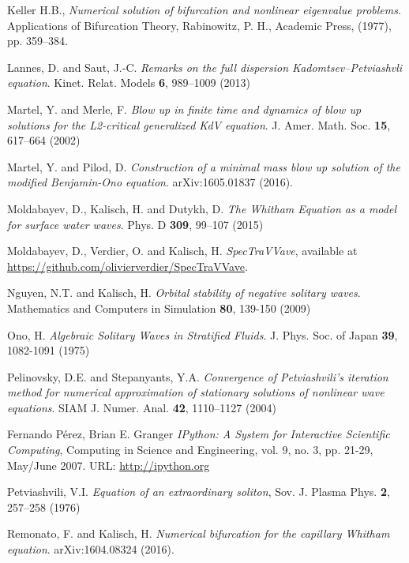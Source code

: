 \begin{thebibliography}{}
 
Keller H.B., 
{\em Numerical solution of bifurcation and nonlinear eigenvalue problems}. 
Applications of Bifurcation Theory, Rabinowitz, P. H., Academic Press, (1977), pp. 359--384. 


 Lannes, D. and Saut, J.-C.
{\em Remarks on the full dispersion Kadomtsev--Petviashvli equation}.
Kinet. Relat. Models \textbf{6}, 989--1009 (2013)



 Martel, Y. and Merle, F.
{\em Blow up in finite time and dynamics of blow up solutions for the L2-critical generalized KdV equation}.
J. Amer. Math. Soc. \textbf{15}, 617--664 (2002)


 Martel, Y. and Pilod, D.
{\em Construction of a minimal mass blow up solution of the modified Benjamin-Ono equation}.
arXiv:1605.01837 (2016).


 Moldabayev, D., Kalisch, H. and  Dutykh, D. 
{\em The Whitham Equation as a model for surface water waves}.
Phys. D  \textbf{309}, 99--107 (2015)


Moldabayev, D., Verdier, O. and Kalisch, H.
{\em SpecTraVVave}, available at \newline
\url{https://github.com/olivierverdier/SpecTraVVave}. 


Nguyen, N.T. and Kalisch, H.
{\em Orbital stability of negative solitary waves}.
Mathematics and Computers in Simulation \textbf{80}, 139-150 (2009) 


 Ono, H.
         {\emph{Algebraic Solitary Waves in Stratified Fluids}}.
         J. Phys. Soc. of Japan \textbf{39}, 1082-1091 (1975)


 Pelinovsky, D.E. and Stepanyants, Y.A. 
{\em Convergence of Petviashvili's iteration method for numerical approximation 
of stationary solutions of nonlinear wave equations}.
SIAM J. Numer. Anal. \textbf{42}, 1110--1127 (2004)

 Fernando Pérez, Brian E. Granger
 \emph{IPython: A System for Interactive Scientific Computing}, 
Computing in Science and Engineering, vol. 9, no. 3, pp. 21-29, May/June 2007.
URL: \url{http://ipython.org}

 Petviashvili, V.I.
{\em Equation of an extraordinary soliton}, 
Sov. J. Plasma Phys. \textbf{2}, 257--258 (1976) 


Remonato, F. and Kalisch, H.
{\em Numerical bifurcation for the capillary Whitham equation}.
arXiv:1604.08324 (2016).



\end{thebibliography}
